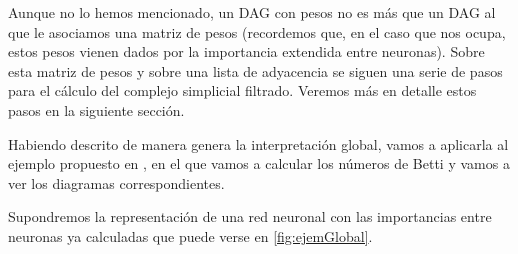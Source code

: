 \documentclass[12pt, a4paper, twoside]{book}
\numberwithin{equation}{section}
\theoremstyle{definition}
\newenvironment{ejem}
  {\pushQED{\qed}\renewcommand{\qedsymbol}{$\blacktriangleleft$}\ejemplo}
  {\popQED\endejemplo}
\theoremstyle{remark}
\theoremstyle{plain}
\begin{document}
	Aunque no lo hemos mencionado, un DAG con pesos no es más que un DAG
	al que le asociamos una matriz de pesos (recordemos que, en el caso 
	que nos ocupa, estos pesos vienen dados por la importancia extendida 
	entre neuronas). Sobre esta matriz de pesos y sobre una lista de 
	adyacencia se siguen una serie de pasos para el cálculo del complejo 
	simplicial filtrado. Veremos más en detalle estos pasos en la 
	siguiente sección. 

	Habiendo descrito de manera genera la interpretación global, vamos a 
	aplicarla al ejemplo propuesto en \cite{Articulo-Watanabe}, en el que 
	vamos a calcular los números de Betti y vamos a ver los diagramas 
	correspondientes.

	\begin{ejem}
		Supondremos la representación de una red neuronal con las 
		importancias entre neuronas ya calculadas que puede verse en 
		\autoref{fig:ejemGlobal}.

		\begin{figure}[!htbp]
				\centering
\end{figure}
\end{ejem}
\end{document}
